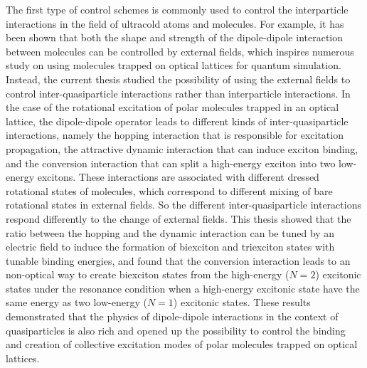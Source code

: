 The first type
of control schemes is commonly used to control the interparticle interactions in the field of ultracold atoms and molecules. 
For example, it has been shown that both the shape and strength of the dipole-dipole interaction between molecules
can be controlled by external fields\cite{micheli2007}, which inspires numerous study on using molecules trapped on optical
lattices for quantum simulation\cite{Barnett2006, micheli2006, Brennen2007, Buchler2007, Carr, Carr2, Trefzger2010, Kestner2011, gorshkov, gorshkov2}. Instead, the current thesis studied the possibility of using the external fields to control
inter-quasiparticle interactions rather than interparticle interactions.  In the case of the rotational excitation of polar molecules 
trapped in an optical lattice, the dipole-dipole operator leads to 
different kinds of inter-quasiparticle interactions, namely the hopping interaction that is responsible for excitation 
propagation, the attractive dynamic interaction that can induce exciton binding, and the conversion interaction that can split
a high-energy exciton into two low-energy excitons. These interactions are associated with different dressed rotational states of molecules, which correspond to different mixing of bare rotational states in external fields.  So the different inter-quasiparticle
interactions respond differently to the change of external fields. 
This thesis showed that the ratio between the hopping and the 
dynamic interaction can be tuned by an electric field to induce the formation of biexciton and triexciton states with tunable 
binding energies, and found that the conversion interaction leads to an non-optical way to create biexciton states from the high-energy ($N=2$)
excitonic states under the resonance condition when a high-energy
excitonic state have the same energy as two low-energy ($N=1$) excitonic states. These results demonstrated that the 
physics of dipole-dipole interactions in the context of quasiparticles is also rich and opened up the possibility to control the 
binding and creation of collective excitation modes of polar molecules trapped on optical lattices. 

